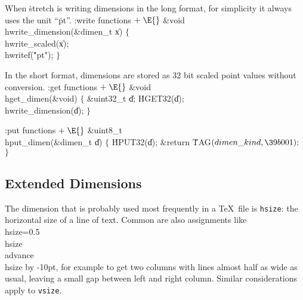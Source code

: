 
When \.{stretch} is writing dimensions in the long format,
for simplicity it always uses the unit ``\.{pt}''.
\writecode
\Y\B\4:write functions\X${}\mathrel+\E{}$\6
\&{void} \\{hwrite\_dimension}(\&{dimen\_t} \|x)\1\1\2\2\1\6
\4${}\{{}$\5
\\{hwrite\_scaled}(\|x);\6
\\{hwritef}(\.{"pt"});\6
\4${}\}{}$\2
\Y
\fi


In the short format, dimensions are stored as 32 bit scaled point values without conversion.
\getcode
\Y\B\4:get functions\X${}\mathrel+\E{}$\6
\&{void} \\{hget\_dimen}(\&{void})\1\1\2\2\1\6
\4${}\{{}$\5
\&{uint32\_t} \|d;\7
\.{HGET32}(\|d);\6
\\{hwrite\_dimension}(\|d);\6
\4${}\}{}$\2
\Y
\fi


\putcode
\Y\B\4:put functions\X${}\mathrel+\E{}$\6
\&{uint8\_t} \\{hput\_dimen}(\&{dimen\_t} \|d)\1\1\2\2\1\6
\4${}\{{}$\5
\.{HPUT32}(\|d);\6
\&{return} \.{TAG}${}(\index{dimen kind+\\{dimen\_kind}}\\{dimen\_kind},\39\\{b001});{}$\6
\4${}\}{}$\2
\Y
\fi




\subsection{Extended Dimensions}
The dimension that is probably used most frequently in a \TeX\ file is {\tt hsize}:
the ho\-ri\-zon\-tal size of a line of text. Common are also assignments
like \.{\\hsize=0.5\\hsize} \.{\\advance\\hsize by -10pt}, for example to
get two columns with lines almost half as wide as usual, leaving a small gap
between left and right column. Similar considerations apply to {\tt vsize}.

